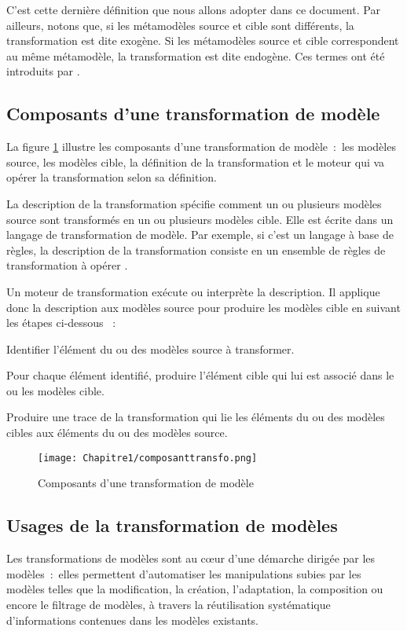 C'est cette dernière définition que nous allons adopter dans ce document. Par ailleurs, notons que, si les métamodèles source et cible sont différents, la transformation est dite exogène. Si les métamodèles source et cible correspondent au même métamodèle, la transformation est dite endogène. Ces termes ont été introduits par \cite{mens2006taxonomy}.

\subsection{Composants d'une transformation de modèle} 
La figure \ref{fig:composantTransfo} illustre les composants d'une transformation de modèle~:~les modèles source, les modèles cible, la définition de la transformation et le moteur qui va opérer la transformation selon sa définition. 

La description de la transformation spécifie comment un ou plusieurs modèles source sont transformés en un ou plusieurs modèles cible. Elle est écrite dans un langage de transformation de modèle. Par exemple, si c'est un langage à base de règles, la description de la transformation consiste en un ensemble de règles de transformation à opérer \cite{kleppe2003mda}. 

Un moteur de transformation exécute ou interprète la description. Il applique donc la description aux modèles source pour produire les modèles cible en suivant les étapes ci-dessous \cite{tratt2005model}~:

\begin{bulletList}
\item Identifier l'élément du ou des modèles source à transformer.
\item Pour chaque élément identifié, produire l'élément cible qui lui est associé dans le ou les modèles cible.
\item Produire une trace de la transformation qui lie les éléments du ou des modèles cibles aux éléments du ou des modèles source.
\end{bulletList}

\begin{figure}[!htbp]
 \begin{center}
   \texttt{[image: Chapitre1/composanttransfo.png]}
 \end{center}
 \caption{Composants d'une transformation de modèle}
 \label{fig:composantTransfo}
\end{figure}

\subsection{Usages de la transformation de modèles }
Les transformations de modèles sont au cœur d'une démarche dirigée par les modèles~:~elles permettent d'automatiser les manipulations subies par les modèles telles que la modification, la création, l'adaptation, la composition ou encore le filtrage de modèles, à travers la réutilisation systématique d'informations contenues dans les modèles existants. 

